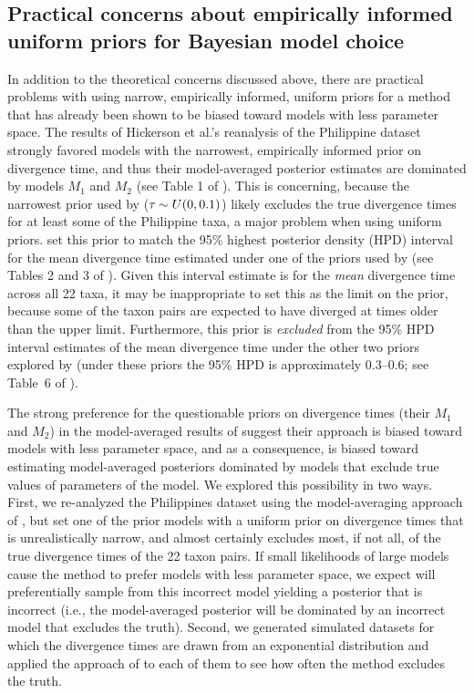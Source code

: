 \subsection{Practical concerns about empirically informed uniform priors for
    Bayesian model choice}
In addition to the theoretical concerns discussed above, there are practical
problems with using narrow, empirically informed, uniform priors for a method
that has already been shown to be biased toward models with less parameter
space.
The results of Hickerson et al.'s \citeyear{Hickerson2013} reanalysis of the
Philippine dataset strongly favored models with the narrowest, empirically
informed prior on divergence time, and thus their model-averaged posterior
estimates are dominated by models $M_1$ and $M_2$ (see Table 1 of
\citet{Hickerson2013}).
This is concerning, because the narrowest \divt{} prior used by
\citet{Hickerson2013} ($\tau_{} \sim U(0,0.1)$) likely excludes the true
divergence times for at least some of the Philippine taxa, a major problem when
using uniform priors.
\citet{Hickerson2013} set this prior to match the 95\% highest posterior
density (HPD) interval for the mean divergence time estimated under one of the
priors used by \citet{Oaks2012} (see Tables 2 and 3 of \citet{Oaks2012}).
Given this interval estimate is for the \emph{mean} divergence time across all
22 taxa, it may be inappropriate to set this as the limit on the prior, because
some of the taxon pairs are expected to have diverged at times older than the
upper limit.
Furthermore, this prior is \emph{excluded} from the 95\% HPD interval estimates
of the mean divergence time under the other two priors explored by
\citet{Oaks2012} (under these priors the 95\% HPD is approximately 0.3--0.6;
see Table~6 of \citet{Oaks2012}).

The strong preference for the questionable priors on divergence times (their
$M_1$ and $M_2$) in the model-averaged results of \citet{Hickerson2013} suggest
their approach is biased toward models with less parameter space, and as a
consequence, is biased toward estimating model-averaged posteriors dominated by
models that exclude true values of parameters of the model.
We explored this possibility in two ways.
First, we re-analyzed the Philippines dataset using the model-averaging
approach of \citet{Hickerson2013}, but set one of the prior models with a
uniform prior on divergence times that is unrealistically narrow, and almost
certainly excludes most, if not all, of the true divergence times of the 22
taxon pairs.
If small likelihoods of large models cause the method to prefer models with
less parameter space, we expect \msb will preferentially sample from this
incorrect model yielding a posterior that is incorrect (i.e., the
model-averaged posterior will be dominated by an incorrect model that excludes
the truth).
Second, we generated simulated datasets for which the divergence times are
drawn from an exponential distribution and applied the approach of
\citet{Hickerson2013} to each of them to see how often the method excludes the
truth.


